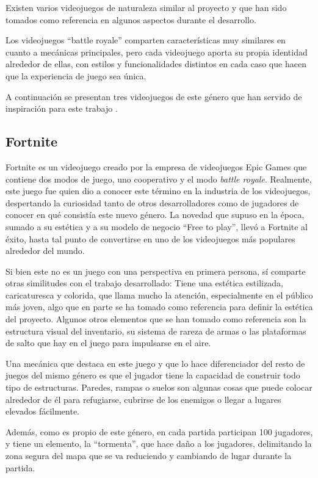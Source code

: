 
Existen varios videojuegos de naturaleza similar al proyecto y que han sido tomados como referencia en algunos aspectos durante el desarrollo.

Los videojuegos ``battle royale'' comparten características muy similares en cuanto a mecánicas principales, pero cada videojuego aporta su propia identidad alrededor de ellas, con estilos y funcionalidades distintos en cada caso que hacen que la experiencia de juego sea única.

A continuación se presentan tres videojuegos de este género que han servido de inspiración para este trabajo \cite{wiki:BestBattleRoyale}.

\subsection{Fortnite}
Fortnite es un videojuego creado por la empresa de videojuegos Epic Games que contiene dos modos de juego, uno cooperativo y el modo \textit{battle royale}. Realmente, este juego fue quien dio a conocer este término en la industria de los videojuegos, despertando la curiosidad tanto de otros desarrolladores como de jugadores de conocer en qué consistía este nuevo género. La novedad que supuso en la época, sumado a su estética y a su modelo de negocio ``Free to play'', llevó a Fortnite al éxito, hasta tal punto de convertirse en uno de los videojuegos más populares alrededor del mundo.

Si bien este no es un juego con una perspectiva en primera persona, sí comparte otras similitudes con el trabajo desarrollado: Tiene una estética estilizada, caricaturesca y colorida, que llama mucho la atención, especialmente en el público más joven, algo que en parte se ha tomado como referencia para definir la estética del proyecto. Algunos otros elementos que se han tomado como referencia son la estructura visual del inventario, su sistema de rareza de armas o las plataformas de salto que hay en el juego para impulsarse en el aire.

Una mecánica que destaca en este juego y que lo hace diferenciador del resto de juegos del mismo género es que el jugador tiene la capacidad de construir todo tipo de estructuras. Paredes, rampas o suelos son algunas cosas que puede colocar alrededor de él para refugiarse, cubrirse de los enemigos o llegar a lugares elevados fácilmente.

Además, como es propio de este género, en cada partida participan 100 jugadores, y tiene un elemento, la ``tormenta'', que hace daño a los jugadores, delimitando la zona segura del mapa que se va reduciendo y cambiando de lugar durante la partida.


